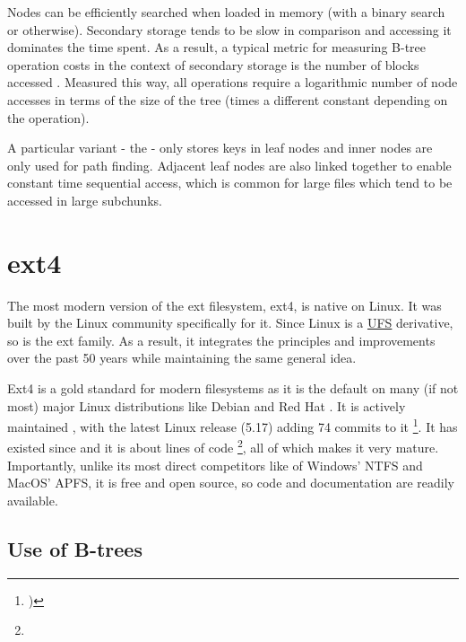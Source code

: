         Nodes can be efficiently searched when loaded in memory (with a binary
        search or otherwise). Secondary storage tends to be slow in comparison
        and accessing it dominates the time spent. As a result, a typical
        metric for measuring B-tree operation costs in the context of secondary
        storage is the number of blocks accessed \cite{btree_ubiquitous}. Measured this way,
        all operations require a logarithmic number of node accesses in terms
        of the size of the tree (times a different constant depending on the
        operation).

        A particular variant - the \bplustree{} - only stores keys in leaf nodes and
        inner nodes are only used for path finding. Adjacent leaf nodes are
        also linked together to enable constant time sequential access, which is common
        for large files which tend to be accessed in large subchunks.

    \section{ext4}
        \label{sec:ext4}

        The most modern version of the ext filesystem, ext4, is native on Linux.
        It was built by the Linux community
        specifically for it. Since Linux is a \hyperref[sec:UFS]{UFS} derivative,
        so is the ext family. As a result, it integrates the principles and
        improvements over the past 50 years while maintaining the same general
        idea.

        Ext4 is a gold standard for modern filesystems as it is the default on
        many (if not most) major Linux distributions like Debian
        \cite{Debian_filesystem} and Red Hat \cite{RedHat_filesystem}. It is
        actively maintained \cite{ext4_mailing_list}, with the latest Linux
        release (5.17) adding 74 commits to it \footnote{)}. It has existed since 
        and it is about  lines of code
        \footnote{}, all of which makes it very mature. Importantly,
        unlike its most direct competitors like of Windows' NTFS and
        MacOS' APFS, it is free and open source, so code and documentation are
        readily available.

        \subsection{Use of B-trees}
            \label{sec:htree}

